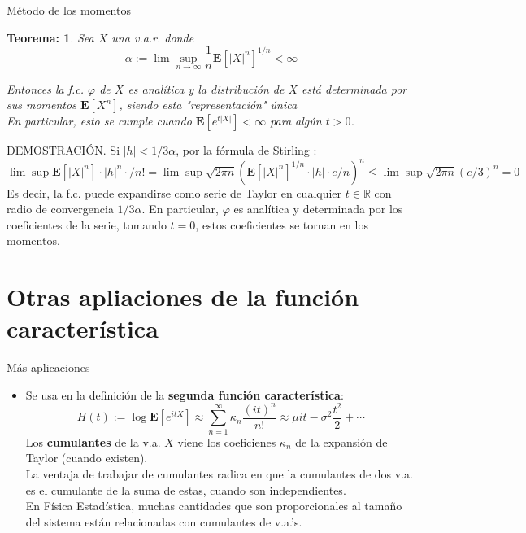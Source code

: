 \documentclass{beamer}
\newcommand{\R}{\mathbb{R}}
\newcommand{\vp}{\varphi}
\newcommand{\E}{\mathbf{E}}
\newtheorem{teo}{Teorema:}
\begin{document}
\begin{frame}{Método de los momentos}
	
	\begin{teo}
			Sea $X$ una v.a.r. donde $$ \alpha := \lim  \sup  \limits  _{n \rightarrow \infty} \frac{1}{n} \E [|X|^{n}] ^{1/n} < \infty $$
		
		Entonces la f.c. $\vp$ de $X$ es analítica y la distribución de $X$ está determinada por sus momentos $\E[X^{n}]$, siendo esta "representación" única\\
		
		En particular, esto se cumple cuando $\E[e^{t|X|}]  < \infty$ para algún $t>0$.
	\end{teo}
	
	DEMOSTRACIÓN. Si $|h|<1/3 \alpha$, por la fórmula de Stirling :
	$ \lim \sup \E[|X|^{n}] \cdot |h|^{n} \cdot /n! = \lim \sup \sqrt{2 \pi n} (\E[|X|^{n}]^{1/n} \cdot |h| \cdot e /n  )^{n} \leq \lim \sup \sqrt{2 \pi n } (e/3)^{n} =0  $\\
	Es decir, la f.c. puede expandirse como serie de Taylor en cualquier $t \in \R$ con radio de convergencia $1/3 \alpha$. En particular, $\vp$ es analítica y determinada por los coeficientes de la serie, tomando $t=0$, estos coeficientes se tornan en los momentos. 
	
	
	
	
\end{frame}



\section{Otras apliaciones de la función característica}

\begin{frame}{Más aplicaciones}
	\begin{itemize}
		\item Se usa en la definición de la \textbf{segunda función característica}: 
		$$ H(t):=  \log \E[ e^{it X} ] \approx \sum_{n=1}^{\infty}  \kappa_{n} \frac{(it)^{n}}{n!} \approx \mu i t -\sigma^{2} \frac{t ^{2}}{2}+ \cdots   $$
		Los \textbf{cumulantes} de la v.a. $X$ viene los coeficienes $\kappa_{n}$ de la expansión de Taylor (cuando existen). \\
		La ventaja de trabajar de cumulantes radica en que la cumulantes de dos v.a. es el cumulante de la suma de estas, cuando son independientes.\\
		En Física Estadística, muchas cantidades que son proporcionales al tamaño del sistema están relacionadas con cumulantes de v.a.'s. 
	\end{itemize}
\end{frame}
\end{document}
